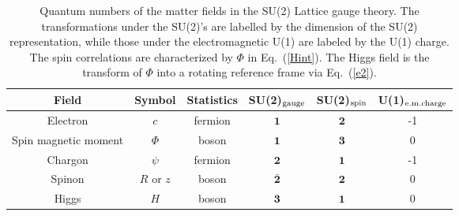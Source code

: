 \documentclass[aps,prb,preprint,onecolumn,citeautoscript,superscriptaddress,footinbib,
eqsecnum]{revtex4-1}
\begin{document}
\begin{table}
\begin{center}
\begin{tabular}{|c|c|c|c|c|c|}
\hline
Field & Symbol & Statistics & SU(2)$_{\rm gauge}$ & SU(2)$_{\rm spin}$ & U(1)$_{\rm e.m. charge}$ \\
\hline 
Electron & $c$ & fermion & ${\bm 1}$ & ${\bm 2}$ & -1\\
Spin magnetic moment & $\Phi$ & boson & ${\bm 1}$ & ${\bm 3}$ & 0 \\
Chargon & $\psi$ & fermion & ${\bm 2}$ & ${\bm 1}$ & -1 \\
Spinon & $R$ or $z$ & boson & $\bar{\bm 2}$ & $ {\bm 2}$ & 0 \\
Higgs & $H$ & boson & ${\bm 3}$ & ${\bm 1}$ & 0 \\
\hline
\end{tabular}~\\~\\
\end{center}
\caption{Quantum numbers of the matter fields in the SU(2) Lattice gauge theory.
The transformations under the SU(2)'s are labelled by the dimension
of the SU(2) representation, while those under the electromagnetic U(1) are labeled by the U(1) charge.
The spin correlations are characterized by $\Phi$ in Eq.~(\ref{Hint}).
The Higgs field is the transform of $\Phi$ into a rotating reference frame via Eq.~(\ref{e2}).}
\label{tab:charge}
\end{table}
\end{document}
